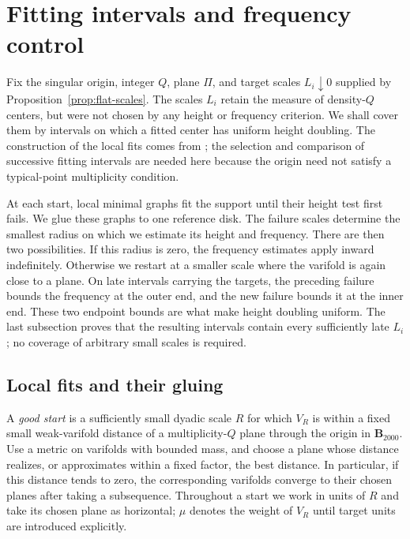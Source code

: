 \section{Fitting intervals and frequency control}\label{sec:fitting}

Fix the singular origin, integer $Q$, plane $\Pi$, and target scales
$L_i\downarrow0$ supplied by Proposition~\ref{prop:flat-scales}.
The scales $L_i$ retain the measure of density-$Q$ centers, but were not
chosen by any height or frequency criterion. We shall cover them by
intervals on which a fitted center has uniform height doubling. The
construction of the local fits comes from \cite[Section~7]{AE}; the
selection and comparison of successive fitting intervals are needed here
because the origin need not satisfy a typical-point multiplicity condition.

At each start, local minimal graphs fit the support until their height
test first fails. We glue these graphs to one reference disk. The failure
scales determine the smallest radius on which we estimate its height
and frequency. There are then two possibilities. If this radius is zero,
the frequency estimates apply inward indefinitely. Otherwise we restart
at a smaller scale where the varifold is again close to a plane.
On late intervals carrying the targets, the preceding failure bounds the
frequency at the outer end, and the new failure bounds it at the inner
end. These two endpoint bounds are what make height doubling
uniform. The last subsection proves that the resulting intervals contain
every sufficiently late $L_i$; no coverage of arbitrary small scales is
required.

\subsection{Local fits and their gluing}

A \emph{good start} is a sufficiently small dyadic scale $R$ for which
$V_R$ is within a fixed small weak-varifold distance of a multiplicity-$Q$
plane through the origin in $\mathbf B_{2000}$. Use a metric on varifolds
with bounded mass, and choose a plane whose distance realizes, or
approximates within a fixed factor, the best distance. In particular, if
this distance tends to zero, the corresponding varifolds converge to
their chosen planes after taking a subsequence. Throughout a start we
work in units of $R$ and take its chosen plane as horizontal; $\mu$
denotes the weight of $V_R$ until target units are introduced explicitly.

